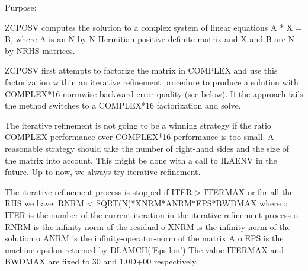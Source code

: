  \begin{DoxyParagraph}{Purpose\+: }
\begin{DoxyVerb} ZCPOSV computes the solution to a complex system of linear equations
    A * X = B,
 where A is an N-by-N Hermitian positive definite matrix and X and B
 are N-by-NRHS matrices.

 ZCPOSV first attempts to factorize the matrix in COMPLEX and use this
 factorization within an iterative refinement procedure to produce a
 solution with COMPLEX*16 normwise backward error quality (see below).
 If the approach fails the method switches to a COMPLEX*16
 factorization and solve.

 The iterative refinement is not going to be a winning strategy if
 the ratio COMPLEX performance over COMPLEX*16 performance is too
 small. A reasonable strategy should take the number of right-hand
 sides and the size of the matrix into account. This might be done
 with a call to ILAENV in the future. Up to now, we always try
 iterative refinement.

 The iterative refinement process is stopped if
     ITER > ITERMAX
 or for all the RHS we have:
     RNRM < SQRT(N)*XNRM*ANRM*EPS*BWDMAX
 where
     o ITER is the number of the current iteration in the iterative
       refinement process
     o RNRM is the infinity-norm of the residual
     o XNRM is the infinity-norm of the solution
     o ANRM is the infinity-operator-norm of the matrix A
     o EPS is the machine epsilon returned by DLAMCH('Epsilon')
 The value ITERMAX and BWDMAX are fixed to 30 and 1.0D+00
 respectively.\end{DoxyVerb}
 
\end{DoxyParagraph}

